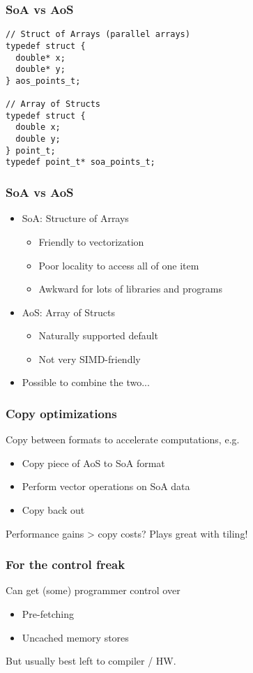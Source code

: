 \documentclass{beamer}
\begin{document}
\begin{frame}[fragile]
  \frametitle{SoA vs AoS}

\begin{lstlisting}
// Struct of Arrays (parallel arrays)
typedef struct {
  double* x;
  double* y;
} aos_points_t;

// Array of Structs
typedef struct {
  double x;
  double y;
} point_t;
typedef point_t* soa_points_t;
\end{lstlisting}

\end{frame}


\begin{frame}
  \frametitle{SoA vs AoS}

  \begin{itemize}
  \item SoA: Structure of Arrays
    \begin{itemize}
    \item Friendly to vectorization
    \item Poor locality to access all of one item
    \item Awkward for lots of libraries and programs
    \end{itemize}
  \item AoS: Array of Structs
    \begin{itemize}
    \item Naturally supported default
    \item Not very SIMD-friendly
    \end{itemize}
  \item Possible to combine the two...
  \end{itemize}
\end{frame}


\begin{frame}
  \frametitle{Copy optimizations}

  Copy between formats to accelerate computations, e.g.
  \begin{itemize}
  \item Copy piece of AoS to SoA format
  \item Perform vector operations on SoA data
  \item Copy back out
  \end{itemize}
  Performance gains > copy costs?  Plays great with tiling!
  
\end{frame}


\begin{frame}
  \frametitle{For the control freak}

  Can get (some) programmer control over
  \begin{itemize}
  \item Pre-fetching
  \item Uncached memory stores
  \end{itemize}
  But usually best left to compiler / HW.
  
\end{frame}
\end{document}
